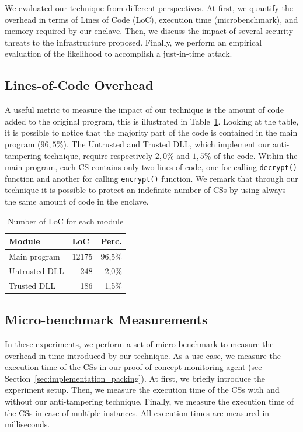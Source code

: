 We evaluated our technique from different perspectives.
At first, we quantify the overhead in terms of Lines of Code (LoC), execution 
time (microbenchmark), and memory required by our enclave.
Then, we discuss the impact of several security threats to the infrastructure 
proposed.
Finally, we perform an empirical evaluation of the likelihood to accomplish a 
just-in-time attack.

\subsection{Lines-of-Code Overhead}

A useful metric to measure the impact of our technique is the amount of code 
added to the original program, this is illustrated in Table~\ref{tbl:loc-stats}.
Looking at the table, it is possible to notice that the majority part of the 
code is contained in the main program ($96,5\%$).
The Untrusted and Trusted DLL, which implement our anti-tampering technique, 
require respectively $2,0\%$ and $1,5\%$ of the code.
Within the main program, each CS contains only two lines of code, one for 
calling \texttt{decrypt()} function and another for calling \texttt{encrypt()} 
function.
We remark that through our technique it is possible to protect an indefinite 
number of CSs by using always the same amount of code in the enclave.
~
\begin{table}[h]
	\center
	\caption{Number of LoC for each module}
	\label{tbl:loc-stats}
	\begin{tabular}{lrr}
		\toprule
		Module & \multicolumn{1}{l}{LoC} & \multicolumn{1}{l}{Perc.} \\
		\midrule
		Main program & 12175 & 96,5\% \\
		Untrusted DLL & 248 & 2,0\% \\
		Trusted DLL & 186 & 1,5\% \\
		\bottomrule
	\end{tabular}
\end{table}

\subsection{Micro-benchmark Measurements}
In these experiments, we perform a set of micro-benchmark to measure the 
overhead in time introduced by our technique.
As a use case, we measure the execution time of the CSs in our proof-of-concept 
monitoring agent (see Section~\ref{sec:implementation_packing}).
At first, we briefly introduce the experiment setup.
Then, we measure the execution time of the CSs with and without our 
anti-tampering technique.
Finally, we measure the execution time of the CSs in case of multiple instances.
All execution times are measured in milliseconds.

